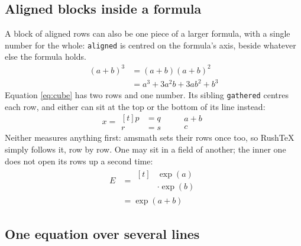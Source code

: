 \documentclass{article}
\numberwithin{equation}{section}
\theoremstyle{definition}
\theoremstyle{remark}
\begin{document}
\subsection{Aligned blocks inside a formula}

A block of aligned rows can also be one piece of a larger formula, with a single number
for the whole: \texttt{aligned} is centred on the formula's axis, beside whatever else
the formula holds.
\begin{equation}
  \begin{aligned}
    (a+b)^{3} &= (a+b)(a+b)^{2} \\
              &= a^{3} + 3a^{2}b + 3ab^{2} + b^{3}
  \end{aligned}
  \label{eq:cube}
\end{equation}
Equation \eqref{eq:cube} has two rows and one number. Its sibling \texttt{gathered}
centres each row, and either can sit at the top or the bottom of its line instead:
\[
  x = \begin{aligned}[t] p &= q \\ r &= s \end{aligned}
  \qquad
  \begin{gathered} a + b \\ c \end{gathered}
\]
Neither measures anything first: amsmath sets their rows once too, so RushTeX simply
follows it, row by row. One may sit in a field of another; the inner one does not open
its rows up a second time:
\[
  \begin{aligned}
    E &= \begin{aligned}[t] &\exp(a)\\ &\cdot \exp(b) \end{aligned} \\
      &= \exp(a+b)
  \end{aligned}
\]

\subsection{One equation over several lines}
\end{document}
